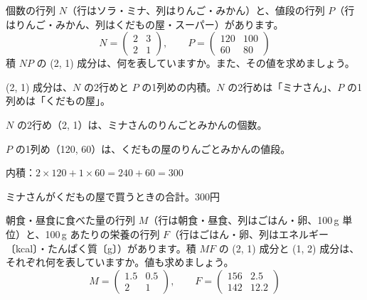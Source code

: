 \begin{reidai}[積の成分の意味を読む]
個数の行列 $N$（行はソラ・ミナ、列はりんご・みかん）と、値段の行列 $P$（行はりんご・みかん、列はくだもの屋・スーパー）があります。
\[ N=\begin{pmatrix} 2 & 3\\ 2 & 1 \end{pmatrix},\qquad P=\begin{pmatrix} 120 & 100\\ 60 & 80 \end{pmatrix} \]
積 $NP$ の (2, 1) 成分は、何を表していますか。また、その値を求めましょう。\par
\kangaekata (2, 1) 成分は、$N$ の2行めと $P$ の1列めの内積。$N$ の2行めは「ミナさん」、$P$ の1列めは「くだもの屋」。\par
\shiki\kviibs{}\zw{} $N$ の2行め（2, 1）は、ミナさんのりんごとみかんの個数。\par
\kviiba $P$ の1列め（120, 60）は、くだもの屋のりんごとみかんの値段。\par
\kviiba 内積：$2\times120+1\times60=240+60=300$\par
\kotae ミナさんがくだもの屋で買うときの合計。300円
\end{reidai}

\begin{jibun}
朝食・昼食に食べた量の行列 $M$（行は朝食・昼食、列はごはん・卵、100\,g 単位）と、100\,g あたりの栄養の行列 $F$（行はごはん・卵、列はエネルギー〔kcal〕・たんぱく質〔g〕）があります。積 $MF$ の (2, 1) 成分と (1, 2) 成分は、それぞれ何を表していますか。値も求めましょう。
\[ M=\begin{pmatrix} 1.5 & 0.5\\ 2 & 1 \end{pmatrix},\qquad F=\begin{pmatrix} 156 & 2.5\\ 142 & 12.2 \end{pmatrix} \]
\end{jibun}

